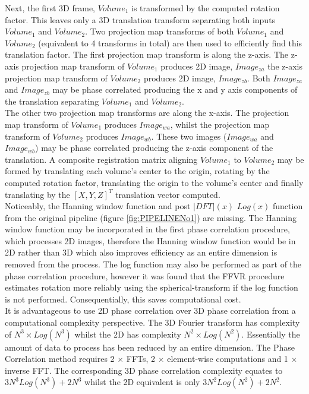 Next, the first 3D frame, $Volume_1$ is transformed by the computed rotation factor. This leaves only a 3D translation transform separating both inputs $Volume_1$ and $Volume_2$. Two projection map transforms of both $Volume_1$ and $Volume_2$ (equivalent to 4 transforms in total) are then used to efficiently find this translation factor. The first projection map transform is along the z-axis. The z-axis projection map transform of $Volume_1$ produces 2D image, $Image_{za}$ the z-axis projection map transform of $Volume_2$ produces 2D image, $Image_{zb}$. Both $Image_{za}$ and $Image_{zb}$ may be phase correlated producing the x and y axis components of the translation separating $Volume_1$ and $Volume_2$. \\

The other two projection map transforms are along the x-axis. The projection map transform of $Volume_1$ produces $Image_{wa}$, whilst the projection map transform of $Volume_2$ produces $Image_{wb}$. These two images ($Image_{wa}$ and $Image_{wb}$) may be phase correlated producing the z-axis component of the translation. A composite registration matrix aligning $Volume_1$ to $Volume_2$ may be formed by translating each volume's center to the origin, rotating by the computed rotation factor, translating the origin to the volume's center and finally translating by the $[X,Y,Z]^T$ translation vector computed. \\

Noticeably, the Hanning window function and post $|DFT|(x)$ $Log(x)$ function from the original pipeline (figure \ref{fig:PIPELINENo1}) are missing. The Hanning window function may be incorporated in the first phase correlation procedure, which processes 2D images, therefore the Hanning window function would be in 2D rather than 3D which also improves efficiency as an entire dimension is removed from the process. The log function may also be performed as part of the phase correlation procedure, however it was found that the FFVR procedure estimates rotation more reliably using the spherical-transform if the log function is not performed. Consequentially, this saves computational cost. \\

It is advantageous to use 2D phase correlation over 3D phase correlation from a computational complexity perspective. The 3D Fourier transform has complexity of $N^3 \times Log(N^3)$ whilst the 2D has complexity $N^2 \times Log(N^2)$. Essentially the amount of data to process has been reduced by an entire dimension. The Phase Correlation method requires 2 $\times$ FFTs, 2 $\times$ element-wise computations and 1 $\times$ inverse FFT. The corresponding 3D phase correlation complexity equates to $3N^3Log(N^3) + 2N^3$ whilst the 2D equivalent is only $3N^2Log(N^2) + 2N^2$. \\ 

